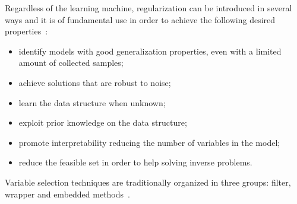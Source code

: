     Regardless of the learning machine, regularization can be introduced in several ways and it is of fundamental use in order to achieve the following desired properties~\citep{okser2014regularized}:
    \begin{itemize}
    	\item identify models with good generalization properties, even with a limited amount of collected samples;
    	\item achieve solutions that are robust to noise;
    	\item learn the data structure when unknown;
    	\item exploit prior knowledge on the data structure;
        \item promote interpretability reducing the number of variables in the model;
    	\item reduce the feasible set in order to help solving inverse problems.
   \end{itemize}

	Variable selection techniques are traditionally organized in three groups: filter, wrapper and embedded methods~\cite{guyon2003introduction}.

